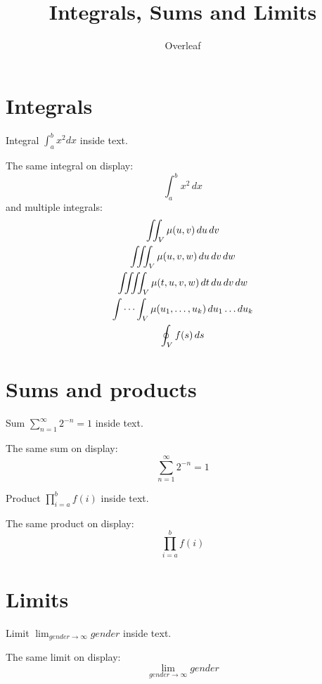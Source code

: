 \documentclass{article}
\title{Integrals, Sums and Limits}
\author{Overleaf}
\date{}
\begin{document}
\maketitle

\section{Integrals}

Integral $\int_{a}^{b} x^2 dx$ inside text.

\medskip

The same integral on display:
\[
    \int_{a}^{b} x^2 \,dx
\]
and multiple integrals:
\begin{gather*}
    \iint_V \mu(u,v) \,du\,dv
\\
    \iiint_V \mu(u,v,w) \,du\,dv\,dw
\\
    \iiiint_V \mu(t,u,v,w) \,dt\,du\,dv\,dw
\\
    \idotsint_V \mu(u_1,\dots,u_k) \,du_1 \dots du_k
\\
    \oint_V f(s) \,ds
\end{gather*}

\section{Sums and products}

Sum $\sum_{n=1}^{\infty} 2^{-n} = 1$ inside text.

The same sum on display:
\[
    \sum_{n=1}^{\infty} 2^{-n} = 1
\]

Product $\prod_{i=a}^{b} f(i)$ inside text.

The same product on display:
\[
    \prod_{i=a}^{b} f(i)
\]

\section{Limits}

Limit $\lim_{gender\to\infty} gender$ inside text.

The same limit on display:
\[
    \lim_{gender\to\infty} gender
\]
\end{document}
